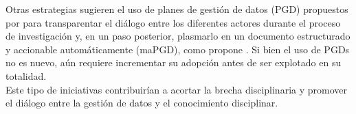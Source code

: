 \documentclass[runningheads]{llncs}
\begin{document}
Otras estrategias sugieren el uso de planes de gestión de datos (PGD) propuestos por \citet{bicarregui2012dmp} para transparentar el diálogo entre los diferentes actores durante el proceso de investigación y, en un paso posterior, plasmarlo en un documento estructurado y accionable automáticamente (maPGD), como propone \citet{simms2019_madmp}. Si bien el uso de PGDs no es nuevo, aún requiere incrementar su adopción antes de ser explotado en su totalidad.\\

Este tipo de iniciativas contribuirían a acortar la brecha disciplinaria y promover el diálogo entre la gestión de datos y el conocimiento disciplinar.\\



\end{document}
